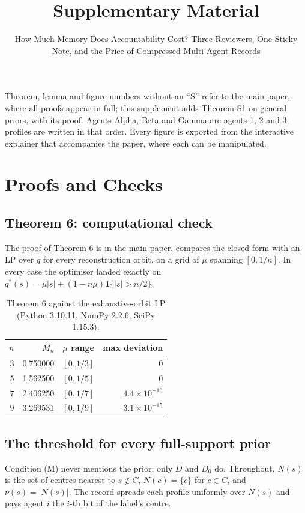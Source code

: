 \documentclass[sigconf,anonymous,acmthm=false]{acmart}
\theoremstyle{acmplain}
\theoremstyle{acmdefinition}
\begin{document}
\title{Supplementary Material}
\subtitle{How Much Memory Does Accountability Cost? Three Reviewers, One Sticky Note, and the Price of Compressed Multi-Agent Records}

\maketitle

Theorem, lemma and figure numbers without an ``S'' refer to the main paper, where all proofs appear in full; this supplement adds Theorem S1 on general priors, with its proof. Agents
\textsf{Alpha}, \textsf{Beta} and \textsf{Gamma} are agents 1, 2 and 3; profiles are written
in that order. Every figure is exported from the interactive explainer that accompanies the
paper, where each can be manipulated.

\appendix
\section{Proofs and Checks}

\subsection{Theorem 6: computational check}
The proof of Theorem 6 is in the main paper.  compares the closed form with an
LP over $q$ for every reconstruction orbit, on a grid of $\mu$ spanning $[0,1/n]$. In every case the optimiser landed exactly on
$q^*(s)=\mu|s|+(1-n\mu)\mathbf1\{|s|>n/2\}$.

\begin{table}[h]
\caption{Theorem 6 against the exhaustive-orbit LP (Python 3.10.11, NumPy 2.2.6, SciPy 1.15.3).}
\label{tab:orbit}
\footnotesize
\begin{tabular}{@{}rrlr@{}}
\toprule
$n$ & $M_n$ & $\mu$ range & max deviation\\
\midrule
3 & 0.750000 & $[0,1/3]$ & 0\\
5 & 1.562500 & $[0,1/5]$ & 0\\
7 & 2.406250 & $[0,1/7]$ & $4.4\times10^{-16}$\\
9 & 3.269531 & $[0,1/9]$ & $3.1\times10^{-15}$\\
\bottomrule
\end{tabular}
\end{table}

\subsection{The threshold for every full-support prior}
Condition (M) never mentions the prior; only $D$ and $D_0$ do. Throughout, $N(s)$ is the set of
centres nearest to $s\notin C$, $N(c)=\{c\}$ for $c\in C$, and $\nu(s)=|N(s)|$. The record
spreads each profile uniformly over $N(s)$ and pays agent $i$ the $i$-th bit of the label's
centre.
\end{document}
